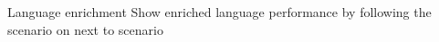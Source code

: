 \begin{frame}{Language enrichment}
    Show enriched language performance by following the scenario on next to scenario


\end{frame}